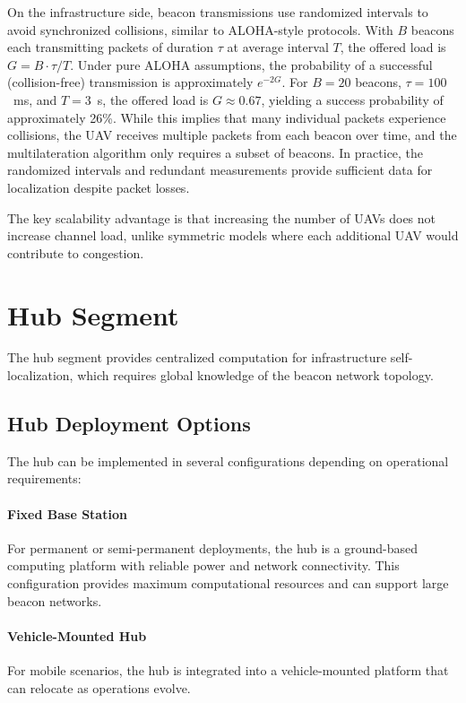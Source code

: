\documentclass[master,final,11pt]{iscs-thesis}
\begin{document}
On the infrastructure side, beacon transmissions use randomized intervals to avoid synchronized collisions, similar to ALOHA-style protocols.
With $B$ beacons each transmitting packets of duration $\tau$ at average interval $T$, the offered load is $G = B \cdot \tau / T$.
Under pure ALOHA assumptions, the probability of a successful (collision-free) transmission is approximately $e^{-2G}$.
For $B = 20$ beacons, $\tau = 100$~ms, and $T = 3$~s, the offered load is $G \approx 0.67$, yielding a success probability of approximately 26\%.
While this implies that many individual packets experience collisions, the UAV receives multiple packets from each beacon over time, and the multilateration algorithm only requires a subset of beacons.
In practice, the randomized intervals and redundant measurements provide sufficient data for localization despite packet losses.

The key scalability advantage is that increasing the number of UAVs does not increase channel load, unlike symmetric models where each additional UAV would contribute to congestion.

\section{Hub Segment}
\label{sec:hub_segment}

The hub segment provides centralized computation for infrastructure self-localization, which requires global knowledge of the beacon network topology.

\subsection{Hub Deployment Options}

The hub can be implemented in several configurations depending on operational requirements:

\paragraph{Fixed Base Station}
For permanent or semi-permanent deployments, the hub is a ground-based computing platform with reliable power and network connectivity.
This configuration provides maximum computational resources and can support large beacon networks.

\paragraph{Vehicle-Mounted Hub}
For mobile scenarios, the hub is integrated into a vehicle-mounted platform that can relocate as operations evolve.
\end{document}
